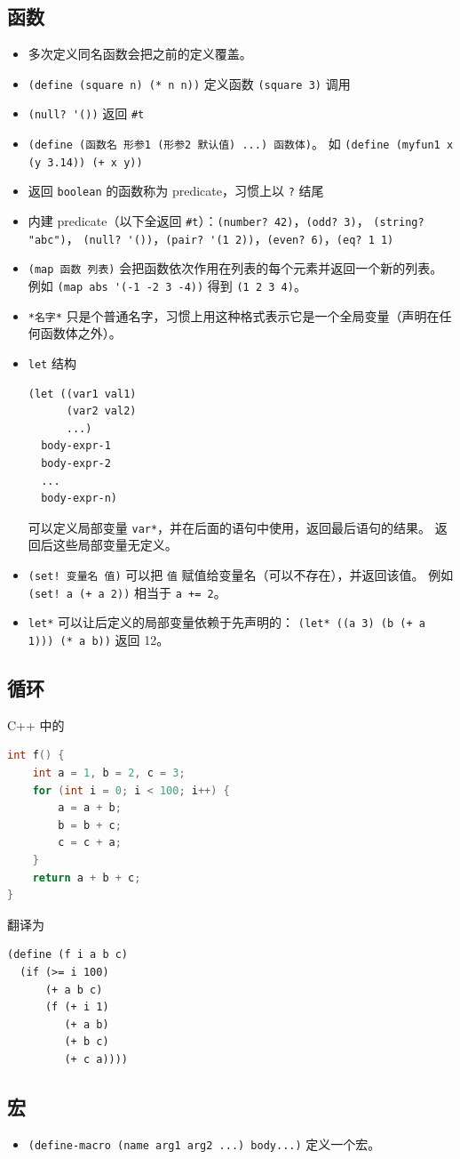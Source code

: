 \subsection{函数}
\begin{itemize}
\item 多次定义同名函数会把之前的定义覆盖。
\item \verb`(define (square n) (* n n))` 定义函数 \verb`(square 3)` 调用
\item \verb`(null? '())` 返回 \verb`#t`
\item \verb`(define (函数名 形参1 (形参2 默认值) ...) 函数体)`。 如 \verb`(define (myfun1 x (y 3.14)) (+ x y))`
\item 返回 \verb`boolean` 的函数称为 predicate，习惯上以 \verb`?` 结尾
\item 内建 predicate（以下全返回 \verb`#t`）：\verb`(number? 42)`，\verb`(odd? 3)`， \verb`(string? "abc")`， \verb`(null? '())`，\verb`(pair? '(1 2))`，\verb`(even? 6)`，\verb`(eq? 1 1)`
\item \verb`(map 函数 列表)` 会把函数依次作用在列表的每个元素并返回一个新的列表。 例如 \verb`(map abs '(-1 -2 3 -4))` 得到 \verb`(1 2 3 4)`。
\item \verb`*名字*` 只是个普通名字，习惯上用这种格式表示它是一个全局变量（声明在任何函数体之外）。
\item \verb`let` 结构
\begin{lstlisting}[language=none]
(let ((var1 val1)
      (var2 val2)
      ...)
  body-expr-1
  body-expr-2
  ...
  body-expr-n)
\end{lstlisting}
可以定义局部变量 \verb`var*`，并在后面的语句中使用，返回最后语句的结果。 返回后这些局部变量无定义。
\item \verb`(set! 变量名 值)` 可以把 \verb`值` 赋值给变量名（可以不存在），并返回该值。 例如 \verb`(set! a (+ a 2))` 相当于 \verb`a += 2`。
\item \verb`let*` 可以让后定义的局部变量依赖于先声明的： \verb`(let* ((a 3) (b (+ a 1))) (* a b))` 返回 12。
\end{itemize}


\subsection{循环}
C++ 中的
\begin{lstlisting}[language=cpp]
int f() {
    int a = 1, b = 2, c = 3;
    for (int i = 0; i < 100; i++) {
        a = a + b;
        b = b + c;
        c = c + a;
    }
    return a + b + c;
}
\end{lstlisting}
翻译为
\begin{lstlisting}[language=none]
(define (f i a b c)
  (if (>= i 100)
      (+ a b c)
      (f (+ i 1)
         (+ a b)
         (+ b c)
         (+ c a))))
\end{lstlisting}

\subsection{宏}
\begin{itemize}
\item \verb`(define-macro (name arg1 arg2 ...) body...)` 定义一个宏。
\end{itemize}
